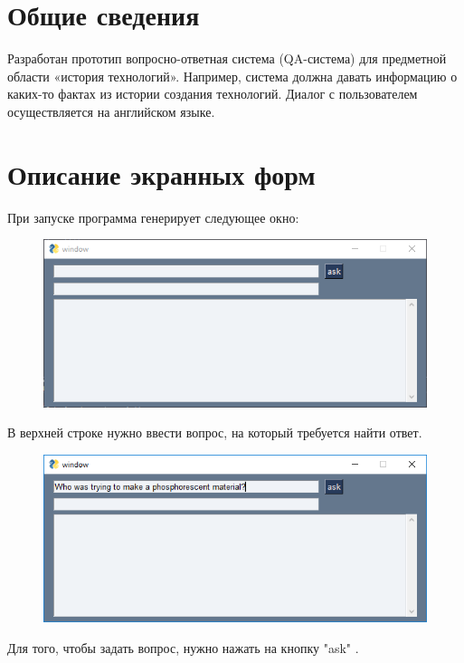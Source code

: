 \documentclass[a4paper,12pt,preview]{report} %
\begin{document}
	\section{Общие сведения}
	
	Разработан прототип вопросно-ответная система (QA-система) для предметной области «история технологий». Например, система должна давать информацию о каких-то фактах из истории создания технологий. Диалог с пользователем осуществляется на английском языке.
	
	\section{Описание экранных форм}
	
	При запуске программа генерирует следующее окно:
	
	
	\begin{figure}[H]
		\centering\includegraphics{win.PNG}
		\caption{}
		\label{fig:win}
	\end{figure}
	
	В верхней строке нужно ввести вопрос, на который требуется найти ответ. 
	
	
	\begin{figure}[H]
		\centering\includegraphics{q11.PNG}
		\caption{}
		\label{fig:ask}
	\end{figure}

	Для того, чтобы задать вопрос, нужно нажать на кнопку "ask" . 
	
\end{document}
